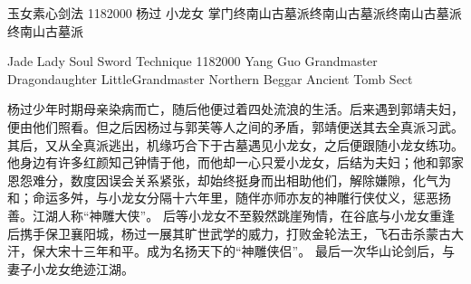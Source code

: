 \documentclass[print, promaster, vlined]{DissertUESTC}
\begin{document}
	
	\newcommand{\shad}[1]{\colorbox{shadcolor}{\ttfamily #1}}
	\newcommand{\shadcmd}[1]{\shad{\ttfamily $\backslash$#1}}
	
	\nocite{*}
	
				{玉女素心剑法}
				{1182000}
				{杨\hspace{1em}过}
				{小龙女}
				{掌\hspace{1em}门}{终南山古墓派终南山古墓派终南山古墓派终南山古墓派}
	
	\uestczhtitlepage
	
					{Jade Lady Soul Sword Technique}
					{1182000}
					{Yang Guo}
					{Grandmaster Dragondaughter Little}{Grandmaster Northern Beggar}
					{Ancient Tomb Sect}
	
	
	\zhabstract
	
	杨过少年时期母亲染病而亡，随后他便过着四处流浪的生活。后来遇到郭靖夫妇，便由他们照看。但之后因杨过与郭芙等人之间的矛盾，郭靖便送其去全真派习武。其后，又从全真派逃出，机缘巧合下于古墓遇见小龙女，之后便跟随小龙女练功。 他身边有许多红颜知己钟情于他，而他却一心只爱小龙女，后结为夫妇；他和郭家恩怨难分，数度因误会关系紧张，却始终挺身而出相助他们，解除嫌隙，化气为和；命运多舛，与小龙女分隔十六年里，随伴亦师亦友的神雕行侠仗义，惩恶扬善。江湖人称“神雕大侠”。 后等小龙女不至毅然跳崖殉情，在谷底与小龙女重逢后携手保卫襄阳城，杨过一展其旷世武学的威力，打败金轮法王，飞石击杀蒙古大汗，保大宋十三年和平。成为名扬天下的“神雕侠侣”。 最后一次华山论剑后，与妻子小龙女绝迹江湖。
	
\end{document}
